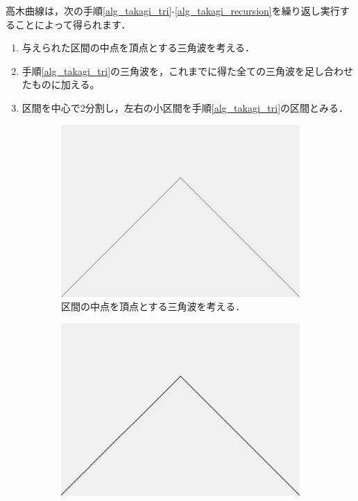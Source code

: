 \documentclass[dvipdfmx]{jsarticle}
\theoremstyle{definition}
\newcommand{\enumproc}{\setlength{\leftskip}{2em}}
\begin{document}
高木曲線は，次の手順\ref{alg_takagi_tri}-\ref{alg_takagi_recursion}を繰り返し実行することによって得られます．
\begin{enumerate}
    \enumproc
    \item 与えられた区間の中点を頂点とする三角波を考える．
        \label{alg_takagi_tri}
    \item 手順\ref{alg_takagi_tri}の三角波を，これまでに得た全ての三角波を足し合わせたものに加える。
        \label{alg_takagi_add}
    \item 区間を中心で2分割し，左右の小区間を手順\ref{alg_takagi_tri}の区間とみる．
        \label{alg_takagi_recursion}
\end{enumerate}
%
\begin{figure}[H]
    \centering
    \begin{subfigure}{0.24\textwidth}
        \centering
        \includegraphics[width=\textwidth]{figure/takagi/takagiwave1.png}
        \caption{区間の中点を頂点とする三角波を考える．}
        \label{fig_proc_takagiwave1}
    \end{subfigure}
    \begin{subfigure}{0.24\textwidth}
        \centering
        \includegraphics[width=\textwidth]{figure/takagi/takagicurve1.png}

\end{subfigure}
\end{figure}
\end{document}
